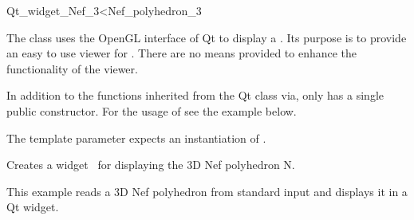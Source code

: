 
\ccRefPageBegin



\begin{ccRefClass}{Qt_widget_Nef_3<Nef_polyhedron_3}

\ccDefinition
 
The class  uses the OpenGL interface of Qt to display a
. Its purpose is to provide an easy to use viewer for 
. There are no means provided to enhance the 
functionality of the viewer.

In addition to the functions inherited from the Qt class  via,
  only has a single public 
constructor. For the usage of  see the example 
below.


\ccParameters
The template parameter expects an instantiation of .

\ccCreation
{}

{Creates a widget \ccVar\ for displaying the 3D Nef polyhedron N.}

\ccSeeAlso


\ccExample
This example reads a 3D Nef polyhedron from standard input and displays it
in a Qt widget.


\end{ccRefClass}

\ccRefPageEnd
